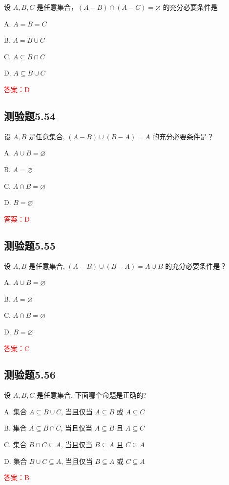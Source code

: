 \documentclass[UTF8, heading=true]{ctexart}
\begin{document}
设 $A, B, C$ 是任意集合，$(A-B) \cap(A-C)=\varnothing$ 的充分必要条件是 $\qquad$


A. $A=B=C $

B. $A=B \cup C $

C. $A \subseteq B \cap C $

D. $A \subseteq B \cup C$

\textcolor{red}{答案：D}



\subsection{测验题5.54}

设 $A, B$ 是任意集合, $(A-B) \cup(B-A)=A$ 的充分必要条件是？

A. $A \cup B=\varnothing$

B. $A=\varnothing$

C. $A \cap B=\varnothing$

D. $B=\varnothing$

\textcolor{red}{答案：D}

\subsection{测验题5.55}
设 $A, B$ 是任意集合, $(A-B) \cup(B-A)=A \cup B$ 的充分必要条件是？

A. $A \cup B=\varnothing$

B. $A=\varnothing$

C. $A \cap B=\varnothing$

D. $B=\varnothing$

\textcolor{red}{答案：C}

\subsection{测验题5.56}

设 $A, B, C$ 是任意集合, 下面哪个命题是正确的?

A. 集合 $A \subseteq B \cup C$, 当且仅当 $A \subseteq B$ 或 $A \subseteq C$

B. 集合 $A \subseteq B \cap C$, 当且仅当 $A \subseteq B$ 且 $A \subseteq C$

C. 集合 $B \cap C \subseteq A$, 当且仅当 $B \subseteq A$ 且 $C \subseteq A$

D. 集合 $B \cup C \subseteq A$, 当且仅当 $B \subseteq A$ 或 $C \subseteq A$

\textcolor{red}{答案：B}
\end{document}
